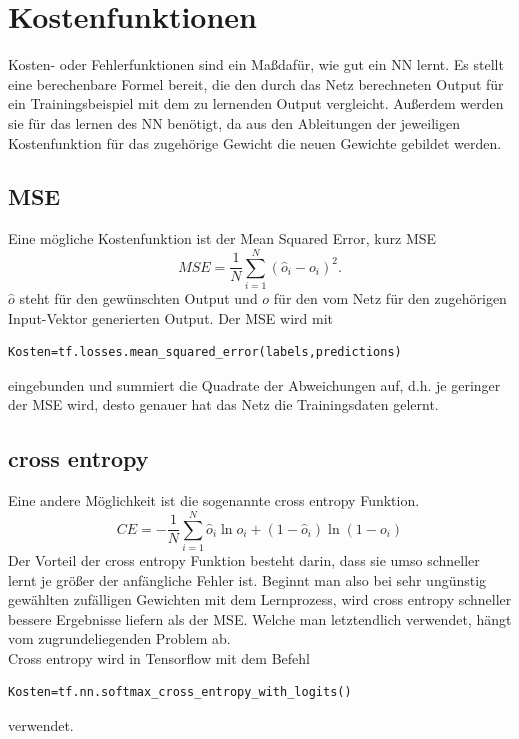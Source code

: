 \section{Kostenfunktionen}
Kosten- oder Fehlerfunktionen sind ein Ma\ss  daf\"ur, wie gut ein \gls{NN} lernt. Es stellt eine berechenbare Formel bereit, die den durch das Netz berechneten Output f\"ur ein Trainingsbeispiel mit dem zu lernenden Output vergleicht. Au\ss erdem werden sie f\"ur das lernen des \gls{NN} ben\"otigt, da aus den Ableitungen der jeweiligen Kostenfunktion f\"ur das zugeh\"orige Gewicht die neuen Gewichte gebildet werden.\cite{Goodfellow}
\subsection{MSE}
Eine m\"ogliche Kostenfunktion ist der Mean Squared Error, kurz MSE \cite{Rojas1996}
\begin{equation}
MSE=\frac{1}{N}\sum_{i=1}^{N} (\hat{o}_i-o_i)^2.
\end{equation}
$\hat{o}$ steht f\"ur den gew\"unschten Output und $o$ f\"ur den vom Netz f\"ur den zugeh\"origen Input-Vektor generierten Output.
Der MSE wird mit \cite{cookbook}
\begin{lstlisting}
Kosten=tf.losses.mean_squared_error(labels,predictions)
\end{lstlisting}
eingebunden und summiert die Quadrate der Abweichungen auf, d.h. je geringer der MSE wird, desto genauer hat das Netz die Trainingsdaten gelernt.
\subsection{cross entropy}
Eine andere M\"oglichkeit ist die sogenannte cross entropy Funktion.\cite{Nielsen}
\begin{equation}
CE= - \frac{1}{N} \sum_{i=1}^{N}\hat{o}_i \ln o_i + (1- \hat{o}_i) \ln (1-o_i)
\end{equation}
Der Vorteil der cross entropy Funktion besteht darin, dass sie umso schneller lernt je gr\"o\ss er der anf\"angliche Fehler ist. Beginnt man also bei sehr ung\"unstig gew\"ahlten zuf\"alligen Gewichten mit dem Lernprozess, wird cross entropy schneller bessere Ergebnisse liefern als der MSE.\cite{Nielsen} Welche man letztendlich verwendet, h\"angt vom zugrundeliegenden Problem ab.\\
Cross entropy wird in Tensorflow mit dem Befehl 
\begin{lstlisting}
Kosten=tf.nn.softmax_cross_entropy_with_logits()
\end{lstlisting}verwendet.\cite{cookbook}
